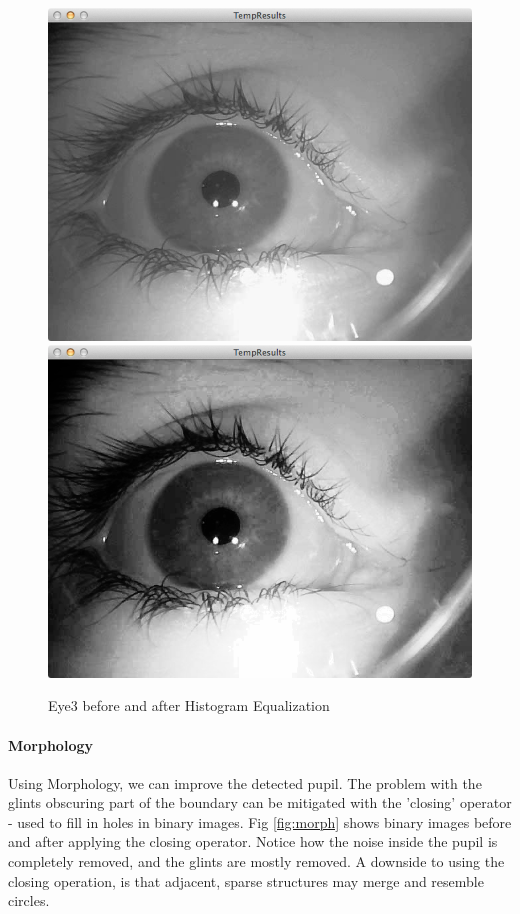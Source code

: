 \documentclass[a4paper,11pt]{article}
\begin{document}
\begin{figure}[ht]
  \centering
  \includegraphics[scale=0.2]{eye3}
  \includegraphics[scale=0.2]{eye3_hist_eq}
  \caption{Eye3 before and after Histogram Equalization}
  \label{fig:eye3_hist_eq}
\end{figure}

\paragraph{Morphology}
Using Morphology, we can improve the detected pupil. The problem with the glints obscuring part of the boundary can be mitigated with the 'closing' operator - used to fill in holes in binary images. Fig \ref{fig:morph} shows binary images before and after applying the closing operator. Notice how the noise inside the pupil is completely removed, and the glints are mostly removed.
A downside to using the closing operation, is that adjacent, sparse structures may merge and resemble circles.
\end{document}
